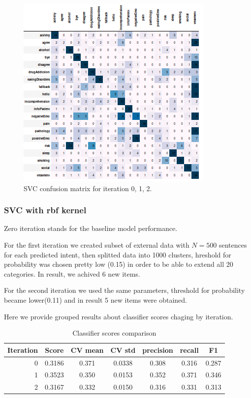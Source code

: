 \documentclass[11pt]{article}
\begin{document}
\begin{figure}[h]
	\includegraphics[scale=0.3]{lsvc_2.png}
	\caption{SVC confusion matrix for iteration 0, 1, 2.}
\label{lsvc_cm}
\end{figure}
\FloatBarrier




\subsubsection{SVC with rbf kernel}
\label{subsec:semisupervised-rbf}

Zero iteration stands for the baseline model performance. 

For the first iteration we created subset of external data with $N=500$ sentences for each predicted intent, then splitted data into 1000 clusters, hreshold for probability was chosen pretty low (0.15) in order to be able to extend all 20 categories. In result, we achived 6 new items.

For the second iteration we  used the same parameters, threshold for probability became lower(0.11) and in result 5 new items were obtained.

Here we provide grouped results about classifier scores chaging by iteration. 

\begin{table}[htb]
\begin{center}
\begin{tabular}{ |r|c|c|c|c|c|c| }
\hline
Iteration 	& Score  & CV mean & CV std & precision & recall & F1 \\ \hline
0			& 0.3186 & 0.371   & 0.0338 & 0.308 	& 0.316  & 0.287 \\ \hline
1			& 0.3523 & 0.350   & 0.0153 & 0.352 	& 0.371  & 0.346 \\ \hline
2 			& 0.3167 & 0.332   & 0.0150 & 0.316 	& 0.331  & 0.313 \\ \hline
\end{tabular}
\caption{Classifier scores comparison}
\label{rbf_gen_scores}
\end{center}
\end{table}
\FloatBarrier
\end{document}
